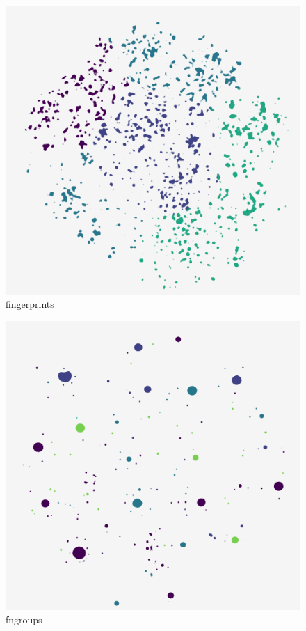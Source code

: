 \begin{subfigure}[b]{.25\linewidth}
    \centering
    \includegraphics[width=\textwidth]{outputs/DRplots/plots/t-SNE_fingerprints.png}
    \caption{fingerprints}
    \label{fig:t-SNE_fingerprints}
\end{subfigure}
\begin{subfigure}[b]{.25\linewidth}
    \centering
    \includegraphics[width=\textwidth]{outputs/DRplots/plots/t-SNE_fngroups.png}
    \caption{fngroups}
    \label{fig:t-SNE_fngroups}
\end{subfigure}
